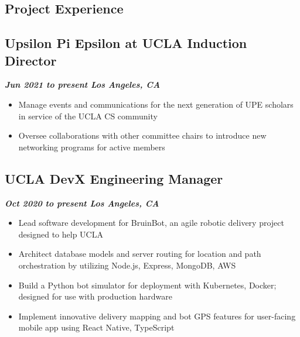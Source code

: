 \documentclass[10pt]{article}
\begin{document}
\begin{raggedright}
    \section*{Project Experience}
        \subsection*{\textbf{\large{Upsilon Pi Epsilon at UCLA \textendash{} Induction Director}}} \hfill \textbf{\textit{Jun 2021 to present \textendash{} Los Angeles, CA}}
        \begin{itemize}
            \item Manage events and communications for the next generation of UPE scholars in service of the UCLA CS community
            \item Oversee collaborations with other committee chairs to introduce new networking programs for active members
        \end{itemize}

        \subsection*{\textbf{\large{UCLA DevX \textendash{} Engineering Manager}}} \hfill \textbf{\textit{Oct 2020 to present \textendash{} Los Angeles, CA}}
        \begin{itemize}
            \item Lead software development for BruinBot, an agile robotic delivery project designed to help UCLA
            \item Architect database models and server routing for location and path orchestration by utilizing Node.js, Express, MongoDB, AWS
            \item Build a Python bot simulator for deployment with Kubernetes, Docker; designed for use with production hardware
            \item Implement innovative delivery mapping and bot GPS features for user-facing mobile app using React Native, TypeScript
        \end{itemize}


\end{raggedright}
\end{document}

